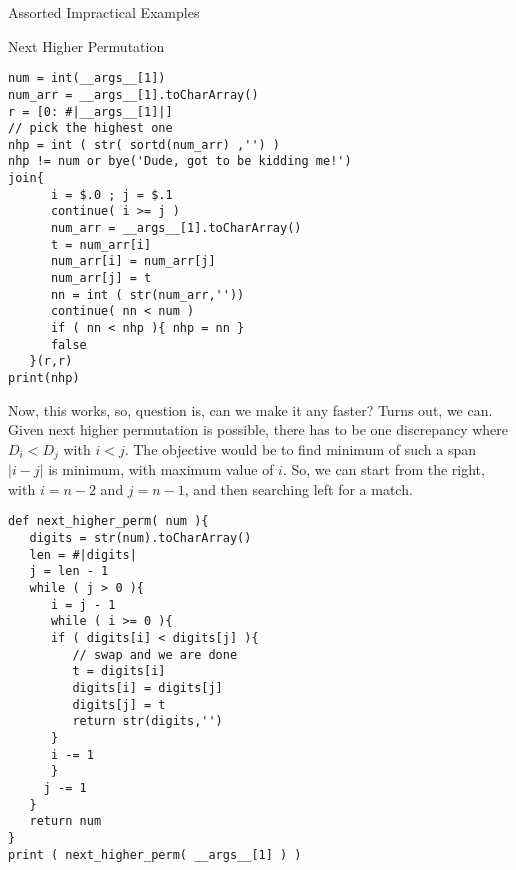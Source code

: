 \begin{section}{Assorted Impractical Examples}
\begin{subsection}{Next Higher Permutation}
\begin{center}\begin{minipage}{\linewidth}
\begin{lstlisting}[style=JexlStyle]
num = int(__args__[1])
num_arr = __args__[1].toCharArray() 
r = [0: #|__args__[1]|]
// pick the highest one 
nhp = int ( str( sortd(num_arr) ,'') )
nhp != num or bye('Dude, got to be kidding me!') 
join{
      i = $.0 ; j = $.1 
      continue( i >= j )
      num_arr = __args__[1].toCharArray() 
      t = num_arr[i]
      num_arr[i] = num_arr[j] 
      num_arr[j] = t 
      nn = int ( str(num_arr,''))
      continue( nn < num )
      if ( nn < nhp ){ nhp = nn }
      false 
   }(r,r)
print(nhp)
\end{lstlisting}  
\end{minipage}\end{center} 
Now, this works, so, question is, can we make it any faster?
Turns out, we can. Given next higher permutation is possible, there
has to be one discrepancy where $D_i < D_j $ with $ i < j $. 
The objective would be to find minimum of such a span $|i-j|$ is minimum, with maximum value of $i$.
So, we can start from the right, with $i=n-2$ and $j=n-1$, and then searching left 
for a match.

\begin{center}\begin{minipage}{\linewidth}
\begin{lstlisting}[style=JexlStyle]
def next_higher_perm( num ){
   digits = str(num).toCharArray() 
   len = #|digits|
   j = len - 1 
   while ( j > 0 ){
      i = j - 1 
      while ( i >= 0 ){
      if ( digits[i] < digits[j] ){
         // swap and we are done 
         t = digits[i]
         digits[i] = digits[j]
         digits[j] = t 
         return str(digits,'') 
      }
      i -= 1 
      }
     j -= 1 
   }
   return num
}
print ( next_higher_perm( __args__[1] ) )
\end{lstlisting}  
\end{minipage}\end{center} 

\end{subsection}


\end{section}




